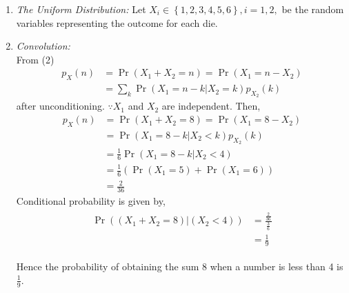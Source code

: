 \documentclass[10pt,twocolumn]{article}
\providecommand{\pr}[1]{\ensuremath{\Pr\left(#1\right)}}
\providecommand{\brak}[1]{\ensuremath{\left(#1\right)}}
\providecommand{\cbrak}[1]{\ensuremath{\left\{#1\right\}}}
\begin{document}
\begin{enumerate}
\newpage
\item  {\em The Uniform Distribution: }Let $X_i \in \cbrak{1,2,3,4,5,6}, i = 1,2,$ be the random variables representing the outcome for each die. 
\item {\em Convolution: } \\
From (2)
\begin{align}
p_X(n) &= \pr{X_1 + X_2 = n} = \pr{X_1  = n -X_2} \\
&= \sum_{k}^{}\pr{X_1  = n -k | X_2 = k}p_{X_2}(k)
\end{align}
after unconditioning. $\because X_1$ and $X_2$ are independent.
Then,
\begin{align}
p_X(n) &= \pr{X_1 + X_2 = 8} = \pr{X_1  = 8 -X_2} \\
&= \pr{X_1  = 8 -k | X_2 < k}p_{X_2}(k) \\
&= \frac{1}{6} \pr{X_1  = 8 -k | X_2 < 4} \\
&= \frac{1}{6} (\pr{X_1 = 5} + \pr{X_1 = 6}) \\
&= \frac{2}{36}
\end{align}
Conditional probability is given by,
\begin{align}
\begin{split}
\Pr{\brak{\brak{X_1 + X_2 = 8}|\brak{X_2<4}}} &= 
\frac{\frac{2}{36}}{\frac{3}{6}}\\
&=\frac{1}{9}
\end{split}
\end{align}  

Hence the probability of obtaining the sum 8 when a number is less than 4 is $\frac{1}{9}$. 

\end{enumerate}
\end{document}
